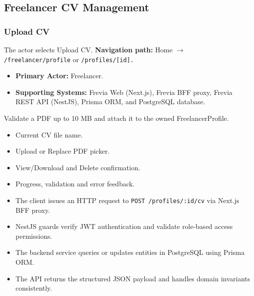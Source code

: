 \subsection{Freelancer CV Management}

\subsubsection{Upload CV}

The actor selects Upload CV.\newline
\textbf{Navigation path:} Home $\rightarrow$ \texttt{/\allowbreak{}freelancer/\allowbreak{}profile} or \texttt{/\allowbreak{}profiles/\allowbreak{}[id].}


\begin{itemize}[leftmargin=1.6em,topsep=3pt,itemsep=2pt,parsep=0pt,label=$\bullet$]
    \item \textbf{Primary Actor:} Freelancer.
    \item \textbf{Supporting Systems:} Frevia Web (Next.js), Frevia BFF proxy, Frevia REST API (NestJS), Prisma ORM, and PostgreSQL database.
\end{itemize}

\noindent Validate a PDF up to 10 MB and attach it to the owned FreelancerProfile.

\begin{itemize}[leftmargin=1.6em,topsep=3pt,itemsep=2pt,parsep=0pt,label=$\bullet$]
    \item Current CV file name.
    \item Upload or Replace PDF picker.
    \item View/Download and Delete confirmation.
    \item Progress, validation and error feedback.
\end{itemize}

\begin{itemize}[leftmargin=1.6em,topsep=3pt,itemsep=2pt,parsep=0pt,label=$\bullet$]
    \item The client issues an HTTP request to \texttt{POST /\allowbreak{}profiles/\allowbreak{}:\allowbreak{}id/\allowbreak{}cv} via Next.js BFF proxy.
    \item NestJS guards verify JWT authentication and validate role-based access permissions.
    \item The backend service queries or updates entities in PostgreSQL using Prisma ORM.
    \item The API returns the structured JSON payload and handles domain invariants consistently.
\end{itemize}

